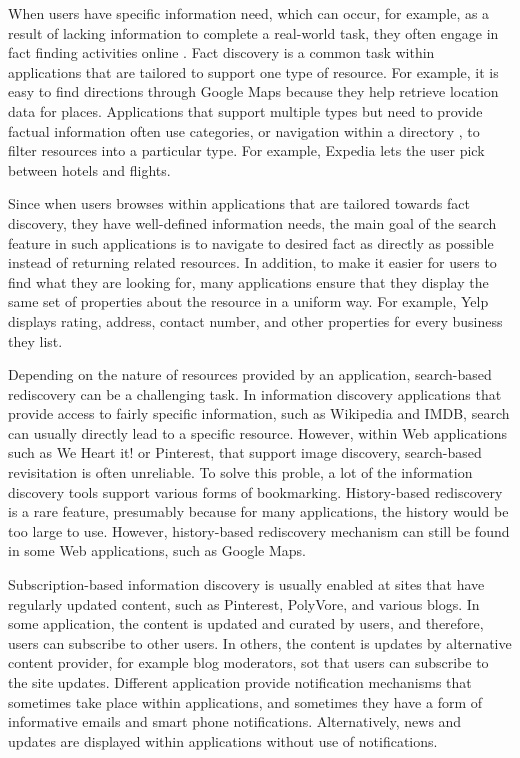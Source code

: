 \documentclass{casconpaper}
\begin{document}
{When users have specific information need, which can occur, for example, as a result of lacking information to complete a real-world task, they often engage in fact finding activities online \cite{kellar2006, kellar2007, sellen}. Fact discovery is a common task within applications that are tailored to support one type of resource. For example, it is easy to find directions through Google Maps because they help retrieve location data for places. Applications that support multiple types but need to provide factual information often use categories, or navigation within a directory \cite{levene}, to filter resources into a particular type. For example, Expedia lets the user pick between hotels and flights. 

Since when users browses within applications that are tailored towards fact discovery, they have well-defined information needs, the main goal of the search feature in such applications is to navigate to desired fact as directly as possible instead of returning related resources. In addition, to make it easier for users to find what they are looking for, many applications ensure that they display the same set of properties about the resource in a uniform way. For example, Yelp displays rating, address, contact number, and other properties for every business they list.

Depending on the nature of resources provided by an application, search-based rediscovery can be a challenging task. In information discovery applications that provide access to fairly specific information, such as Wikipedia and IMDB, search can usually directly lead to a specific resource. However, within Web applications such as We Heart it! or Pinterest, that support image discovery, search-based revisitation is often unreliable. To solve this proble, a lot of the information discovery tools support various forms of bookmarking. History-based rediscovery is a rare feature, presumably because for many applications, the history would be too large to use. However, history-based rediscovery mechanism can still be found in some Web applications, such as Google Maps.

Subscription-based information discovery is usually enabled at sites that have regularly updated content, such as Pinterest, PolyVore, and various blogs. In some application, the content is updated and curated by users, and therefore, users can subscribe to other users. In others, the content is updates by alternative content provider, for example blog moderators, sot that users can subscribe to the site updates. Different application provide notification mechanisms that sometimes take place within applications, and sometimes they have a form of informative emails and smart phone notifications. Alternatively, news and updates are displayed within applications without use of notifications.

}
\end{document}
